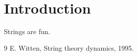 \section{Introduction}
Strings are fun.
\begin{thebibliography}{9}
 E. Witten, String theory dynamics, 1995.
\end{thebibliography}